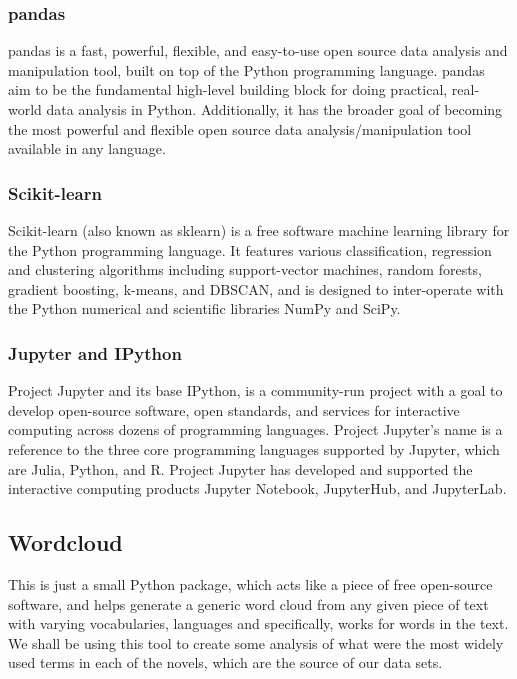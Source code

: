 \subsubsection{pandas}

pandas is a fast, powerful, flexible, and easy-to-use open source data analysis and manipulation tool, built on top of the Python programming language. pandas aim to be the fundamental high-level building block for doing practical, real-world data analysis in Python. Additionally, it has the broader goal of becoming the most powerful and flexible open source data analysis/manipulation tool available in any language.

\subsubsection{Scikit-learn}

Scikit-learn (also known as sklearn) is a free software machine learning library for the Python programming language. It features various classification, regression and clustering algorithms including support-vector machines, random forests, gradient boosting, k-means, and DBSCAN, and is designed to inter-operate with the Python numerical and scientific libraries NumPy and SciPy.

\subsubsection{Jupyter and IPython}

Project Jupyter and its base IPython, is a community-run project with a goal to develop open-source software, open standards, and services for interactive computing across dozens of programming languages. Project Jupyter's name is a reference to the three core programming languages supported by Jupyter, which are Julia, Python, and R.  Project Jupyter has developed and supported the interactive computing products Jupyter Notebook, JupyterHub, and JupyterLab.

\subsection{Wordcloud}

This is just a small Python package, which acts like a piece of free open-source software, and helps generate a generic word cloud from any given piece of text with varying vocabularies, languages and specifically, works for words in the text. We shall be using this tool to create some analysis of what were the most widely used terms in each of the novels, which are the source of our data sets.